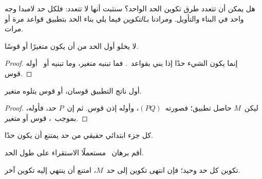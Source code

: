 \documentclass[../../../include/open-logic-section]{subfiles}
\begin{document}

هل يمكن أن تتعدد طرق تكوين الحد الواحد؟ سنثبت أنها لا تتعدد:
فلكل حد لامبدا وجه واحد في البناء والتأويل. ومرادنا بـ\emph{التكوين}
فيما يلي بناء الحد بتطبيق قواعد  مرة أو مرات.

\begin{lem}
لا يخلو أول الحد من أن يكون متغيرًا أو قوسًا.
\end{lem}

\begin{proof}
إنما يكون الشيء حدًا إذا بني بقواعد~.
فما تبنيه  متغير، وما تبنيه
 أو~ أوله قوس.
\end{proof}

\begin{lem}
أول ناتج التطبيق قوسان، أو قوس يتلوه متغير.
\end{lem}

\begin{proof}
ليكن~$M$ حاصل تطبيق؛ فصورته~$(PQ)$، وأوله إذن قوس.
ثم إن~$P$ حد، فأوله، بموجب~، قوس أو متغير.
\end{proof}

\begin{lem}
كل جزء ابتدائي حقيقي من حد يمتنع أن يكون حدًا.
\end{lem}

\begin{prob}
أقم برهان~ مستعملًا الاستقراء على طول الحد.
\end{prob}

\begin{prop} 
تكوين كل حد وحيد؛ فإن انتهى تكوين إلى حد~$M$، امتنع أن ينتهي إليه تكوين آخر.
\end{prop}
\end{document}
